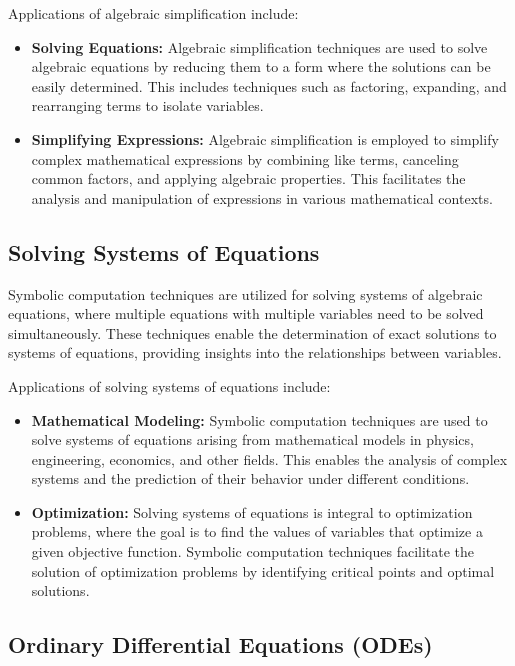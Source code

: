 Applications of algebraic simplification include:
%
\begin{itemize}
  \item \textbf{Solving Equations:} Algebraic simplification techniques are used to solve algebraic equations by reducing them to a form where the solutions can be easily determined. This includes techniques such as factoring, expanding, and rearranging terms to isolate variables.
  \item \textbf{Simplifying Expressions:} Algebraic simplification is employed to simplify complex mathematical expressions by combining like terms, canceling common factors, and applying algebraic properties. This facilitates the analysis and manipulation of expressions in various mathematical contexts.
\end{itemize}

\subsection{Solving Systems of Equations}

Symbolic computation techniques are utilized for solving systems of algebraic equations, where multiple equations with multiple variables need to be solved simultaneously. These techniques enable the determination of exact solutions to systems of equations, providing insights into the relationships between variables.

Applications of solving systems of equations include:
%
\begin{itemize}
  \item \textbf{Mathematical Modeling:} Symbolic computation techniques are used to solve systems of equations arising from mathematical models in physics, engineering, economics, and other fields. This enables the analysis of complex systems and the prediction of their behavior under different conditions.
  \item \textbf{Optimization:} Solving systems of equations is integral to optimization problems, where the goal is to find the values of variables that optimize a given objective function. Symbolic computation techniques facilitate the solution of optimization problems by identifying critical points and optimal solutions.
\end{itemize}

\subsection{Ordinary Differential Equations (ODEs)}

